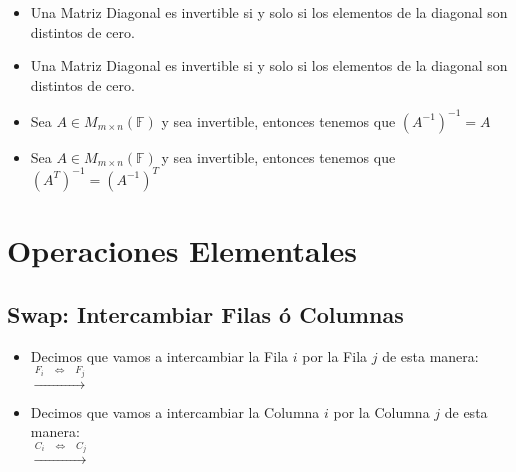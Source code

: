 \documentclass[12pt]{report}                                    %
\newenvironment{SmallIndentation}[1][0.75em]                    %
    {\begin{adjustwidth}{#1}{}\begin{footnotesize}}                 %
    {\end{footnotesize}\end{adjustwidth}}                           %
\DeclareMathOperator \Space {\quad}                             %
\DeclareMathOperator \MiniSpace {\;}                            %
\newcommand \lequal {\MiniSpace \Leftrightarrow \MiniSpace}     %
\newcommand \longto {\longrightarrow}                           %
\begin{document}
\begin{itemize}
\begin{SmallIndentation}[1em]
                        \end{SmallIndentation}

                    \clearpage

                    \item Una Matriz Diagonal es invertible si y solo si los elementos de la diagonal
                        son distintos de cero.

                    \item Una Matriz Diagonal es invertible si y solo si los elementos de la diagonal
                        son distintos de cero.

                    \item Sea $A \in M_{m \times n}(\mathbb{F})$ y sea invertible, entonces tenemos
                        que $(A^{-1})^{-1} = A$

                    \item Sea $A \in M_{m \times n}(\mathbb{F})$ y sea invertible, entonces tenemos
                        que $(A^T)^{-1} = (A^{-1})^T$

                \end{itemize}
            






        \clearpage
        \section{Operaciones Elementales}

            \subsection{Swap: Intercambiar Filas ó Columnas}

                \begin{itemize}
                    \item
                        Decimos que vamos a intercambiar la Fila $i$ por la Fila $j$ de
                        esta manera:\\
                        $\overset{F_i \lequal F_j}{\longto}$

                    \item
                        Decimos que vamos a intercambiar la Columna $i$ por la Columna $j$ de
                        esta manera:\\
                        $\overset{C_i \lequal C_j}{\longto}$
                \end{itemize}
\end{document}
